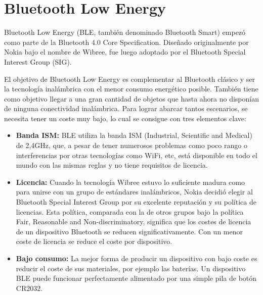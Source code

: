 
\cleardoublepage


\chapter{Bluetooth Low Energy}
\label{makereference2}

Bluetooth Low Energy (BLE, también denominado Bluetooth Smart) empezó como parte de la Bluetooth 4.0 Core Specification. Diseñado originalmente por Nokia bajo el nombre de Wibree, fue luego adoptado por el Bluetooth Special Interest Group (SIG).

El objetivo de Bluetooth Low Energy es complementar al Bluetooth clásico y ser la tecnología inalámbrica con el menor consumo energético posible. También tiene como objetivo llegar a una gran cantidad de objetos que hasta ahora no disponían de ninguna conectividad inalámbrica. Para lograr abarcar tantos escenarios, se necesita tener un coste muy bajo, lo cual se consigue con tres elementos clave:

\begin{itemize}

	\item \textbf{Banda ISM:} BLE utiliza la banda ISM (Industrial, Scientific and Medical) de 2,4GHz, que, a pesar de tener numerosos problemas como poco rango o interferencias por otras tecnologías como WiFi, etc, está disponible en todo el mundo con las mismas reglas y no tiene requisitos de licencia.

	\item \textbf{Licencia:} Cuando la tecnología Wibree estuvo lo suficiente madura como para unirse con un grupo de estándares inalámbricos, Nokia decidió elegir al Bluetooth Special Interest Group por su excelente reputación y su política de licencias. Esta política, comparada con la de otros grupos bajo la política Fair, Reasonable and Non-discriminatory, significa que los costes de licencia de un dispositivo Bluetooth se reducen significativamente. Con un menor coste de licencia se reduce el coste por dispositivo.

	\item \textbf{Bajo consumo:} La mejor forma de producir un dispositivo con bajo coste es reducir el coste de sus materiales, por ejemplo las baterías. Un dispositivo BLE puede funcionar perfectamente alimentado por una simple pila de botón CR2032.

\end{itemize}

